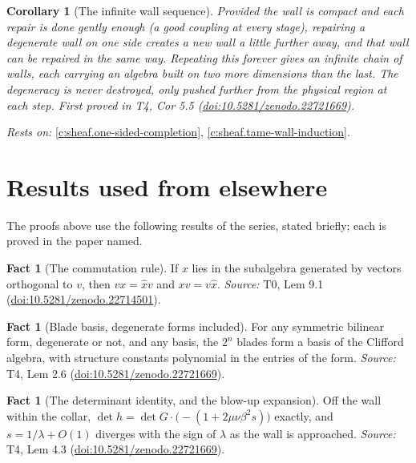 \documentclass[11pt]{article}
\newtheorem{corollary}[theorem]{Corollary}
\theoremstyle{definition}
\newtheorem{fact}[theorem]{Fact}
\theoremstyle{plain}
\begin{document}
\begin{corollary}[The infinite wall sequence]\label{c:sheaf.infinite-wall-sequence}
Provided the wall is compact and each repair is done gently enough (a good coupling at every stage), repairing a degenerate wall on one side creates a new wall a little further away, and that wall can be repaired in the same way. Repeating this forever gives an infinite chain of walls, each carrying an algebra built on two more dimensions than the last. The degeneracy is never destroyed, only pushed further from the physical region at each step.
\emph{First proved in} T4, Cor 5.5 (\href{https://doi.org/10.5281/zenodo.22721669}{doi:10.5281/zenodo.22721669}).
\end{corollary}
\noindent\emph{Rests on:} \ref{c:sheaf.one-sided-completion}, \ref{c:sheaf.tame-wall-induction}.

\section{Results used from elsewhere}
The proofs above use the following results of the series, stated briefly; each is proved in the paper named.

\begin{fact}[The commutation rule]\label{c:primer.commutation-rule}
If $x$ lies in the subalgebra generated by vectors orthogonal to $v$, then $v x = \hat{x} v$ and $x v = v \hat{x}$.
\emph{Source:} T0, Lem 9.1 (\href{https://doi.org/10.5281/zenodo.22714501}{doi:10.5281/zenodo.22714501}).
\end{fact}

\begin{fact}[Blade basis, degenerate forms included]\label{c:sheaf.blade-basis-degenerate-forms-included}
For any symmetric bilinear form, degenerate or not, and any basis, the $2^n$ blades form a basis of the Clifford algebra, with structure constants polynomial in the entries of the form.
\emph{Source:} T4, Lem 2.6 (\href{https://doi.org/10.5281/zenodo.22721669}{doi:10.5281/zenodo.22721669}).
\end{fact}

\begin{fact}[The determinant identity, and the blow-up expansion]\label{c:sheaf.determinant-identity-blow-up-expansion}
Off the wall within the collar, $\det h = \det G \cdot \bigl(-(1 + 2\mu\nu\beta^2 s)\bigr)$ exactly, and $s = 1/\lambda + O(1)$ diverges with the sign of $\lambda$ as the wall is approached.
\emph{Source:} T4, Lem 4.3 (\href{https://doi.org/10.5281/zenodo.22721669}{doi:10.5281/zenodo.22721669}).
\end{fact}
\end{document}
